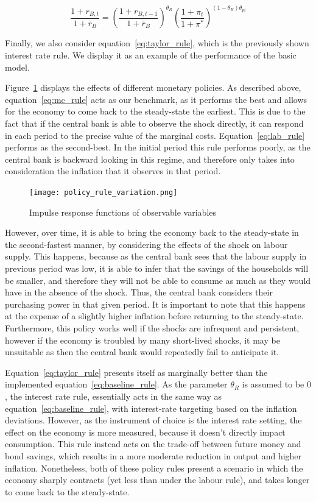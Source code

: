 \documentclass[12pt]{article}
\begin{document}
\begin{equation}\label{eq:taylor_rule}
    \frac{1 + r_{B,t}}{1 + \bar{r}_B} = \left( \frac{1 + r_{B,t-1}}{1 + \bar{r}_B} \right)^{\theta_R} \left( \frac{1 + \pi_t}{1 + \pi^*} \right)^{(1 - \theta_R)\theta_{pi}}
\end{equation}

Finally, we also consider equation~\ref{eq:taylor_rule}, which is the previously shown interest rate rule. We display it as an example of the performance of the basic model.  

Figure~\ref{fig:policy_rule_variation} displays the effects of different monetary policies. As described above, equation~\ref{eq:mc_rule} acts as our benchmark, as it performs the best and allows for the economy to come back to the steady-state the earliest. This is due to the fact that if the central bank is able to observe the shock directly, it can respond in each period to the precise value of the marginal costs. Equation~\ref{eq:lab_rule} performs as the second-best. In the initial period this rule performs poorly, as the central bank is backward looking in this regime, and therefore only takes into consideration the inflation that it observes in that period.  

\begin{figure}[!h]
    \caption{Impulse response functions of observable variables}\label{fig:policy_rule_variation}
    \centering
    \texttt{[image: policy\_rule\_variation.png]}
\end{figure}

However, over time, it is able to bring the economy back to the steady-state in the second-fastest manner, by considering the effects of the shock on labour supply. This happens, because as the central bank sees that the labour supply in previous period was low, it is able to infer that the savings of the households will be smaller, and therefore they will not be able to consume as much as they would have in the absence of the shock. Thus, the central bank considers their purchasing power in that given period. It is important to note that this happens at the expense of a slightly higher inflation before returning to the steady-state. Furthermore, this policy works well if the shocks are infrequent and persistent, however if the economy is troubled by many short-lived shocks, it may be unsuitable as then the central bank would repeatedly fail to anticipate it.

Equation~\ref{eq:taylor_rule} presents itself as marginally better than the implemented equation~\ref{eq:baseline_rule}. As the parameter $\theta_R$ is assumed to be $0$, the interest rate rule, essentially acts in the same way as equation~\ref{eq:baseline_rule}, with interest-rate targeting based on the inflation deviations. However, as the instrument of choice is the interest rate setting, the effect on the economy is more measured, because it doesn't directly impact consumption. This rule instead acts on the trade-off between future money and bond savings, which results in a more moderate reduction in output and higher inflation. Nonetheless, both of these policy rules present a scenario in which the economy sharply contracts (yet less than under the labour rule), and takes longer to come back to the steady-state. 
\end{document}
